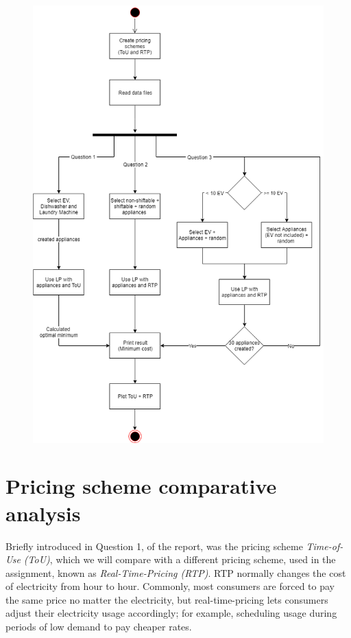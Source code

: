 \documentclass{article}
\begin{document}
     \begin{figure}[ht]
    \includegraphics[scale=0.4]{flowChart.png}
    \centering
    \end{figure}




\newpage

    \section{Pricing scheme comparative analysis}
        Briefly introduced in Question 1, of the report, was the pricing scheme \emph{Time-of-Use (ToU)}, which we will compare with a different pricing scheme, used in the assignment, known as \emph{Real-Time-Pricing (RTP)}. RTP normally changes the cost of electricity from hour to hour. Commonly, most consumers are forced to pay the same price no matter the electricity, but real-time-pricing lets consumers adjust their electricity usage accordingly; for example, scheduling usage during periods of low demand to pay cheaper rates.
\end{document}
